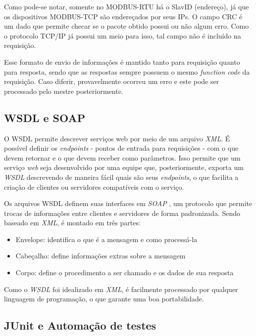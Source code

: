         Como pode-se notar, somente no MODBUS-RTU há o SlavID (endereço), já que os dispositivos MODBUS-TCP são endereçados por seus IPs. O campo CRC é um dado que permite checar se o pacote obtido possui ou não algum erro. Como o protocolo TCP/IP já possui um meio para isso, tal campo não é incluído na requisição.

        Esse formato de envio de informações é mantido tanto para requisição quanto para resposta, sendo que as respostas sempre possuem o mesmo \textit{function code} da requisição. Caso diferir, provavelmente ocorreu um erro e este pode ser processado pelo mestre posteriormente.

    \subsection{WSDL e SOAP}
    \label{methodology:tools:wsdlsoap}

      O WSDL \cite{w3c-spec-wsdl} permite descrever serviços web por meio de um arquivo \textit{\ac{XML}}. É possível definir os \textit{endpoints} - pontos de entrada para requisições - com o que devem retornar e o que devem receber como parâmetros. Isso permite que um serviço \textit{web} seja desenvolvido por uma equipe que, posteriormente, exporta um \textit{\ac{WSDL}} descrevendo de maneira fácil quais são seus \textit{endpoints}, o que facilita a criação de clientes ou servidores compatíveis com o serviço.

      Os arquivos WSDL definem suas interfaces em \textit{\ac{SOAP}} \cite{w3c-spec-soap}, um protocolo que permite trocas de informações entre clientes e servidores de forma padronizada. Sendo baseado em \textit{\ac{XML}}, é montado em três partes:
      \begin{itemize}
        \item Envelope: identifica o que é a mensagem e como processá-la
        \item Cabeçalho: define informações extras sobre a mensagem
        \item Corpo: define o procedimento a ser chamado e os dados de sua resposta
      \end{itemize}

      Como o \textit{\ac{WSDL}} foi idealizado em \textit{\ac{XML}}, é facilmente processado por qualquer linguagem de programação, o que garante uma boa portabilidade.

    \subsection{JUnit e Automação de testes}
    \label{methodology:tools:junit}

